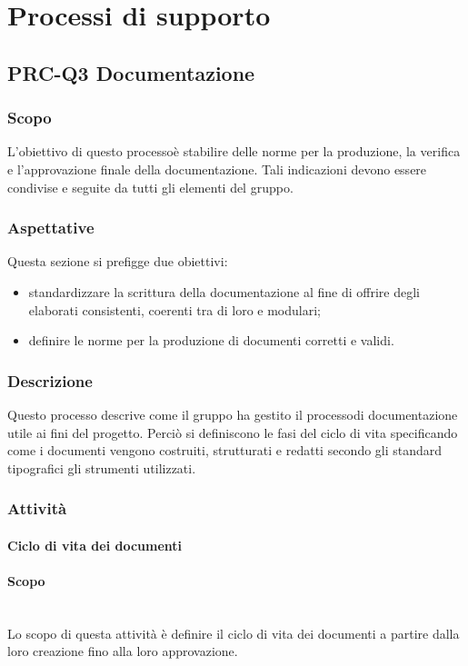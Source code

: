 \section{Processi di supporto}
    \subsection{PRC-Q3 Documentazione}
        \subsubsection{Scopo}
            L'obiettivo di questo processo\glosp è stabilire delle norme per la produzione, la verifica e l'approvazione finale della documentazione. Tali indicazioni devono essere condivise e seguite da tutti gli elementi del gruppo.
        \subsubsection{Aspettative}
            Questa sezione si prefigge due obiettivi:
            \begin{itemize}
                \item standardizzare la scrittura della documentazione al fine di offrire degli elaborati consistenti, coerenti tra di loro e modulari;
                \item definire le norme per la produzione di documenti corretti e validi.
            \end{itemize}
        \subsubsection{Descrizione}
        	Questo processo descrive come il gruppo ha gestito il processo\glosp di documentazione utile ai fini del progetto\glo.
        	Perciò si definiscono le fasi del ciclo di vita specificando come i documenti vengono costruiti, strutturati e redatti secondo gli standard tipografici gli strumenti utilizzati.
        \subsubsection{Attività}
        \paragraph{Ciclo di vita dei documenti}
	        \paragraph*{Scopo}\mbox{}\\ [1mm]
	        Lo scopo di questa attività è definire il ciclo di vita dei documenti a partire dalla loro creazione fino alla loro approvazione.
